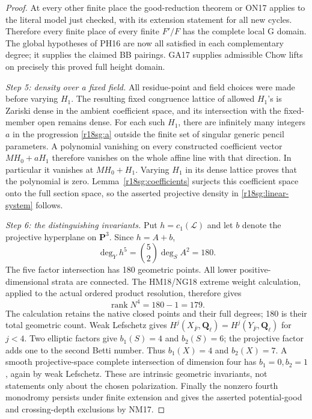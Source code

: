 \begin{proof}
At every other finite place the
good-reduction theorem or ON17
applies to the literal model just
checked, with its extension statement
for all new cycles.  Therefore every
finite place of every finite \(F'/F\)
has the complete local G domain.
The global hypotheses of PH16 are
now all satisfied in each complementary
degree; it supplies the claimed BB
pairings.  GA17 supplies admissible
Chow lifts on precisely this proved
full height domain.

\emph{Step 5: density over a fixed field.}
All residue-point and field choices
were made before varying \(H_1\).
The resulting fixed congruence lattice
of allowed \(H_1\)'s is Zariski dense
in the ambient coefficient space,
and its intersection with the
fixed-member open remains dense.
For each such \(H_1\), there are
infinitely many integers \(a\) in
the progression \eqref{r18sg:a}
outside the finite set of singular
generic pencil parameters.
A polynomial vanishing on every
constructed coefficient vector
\(MH_0+aH_1\) therefore vanishes
on the whole affine line with
that direction.  In particular
it vanishes at \(MH_0+H_1\).
Varying \(H_1\) in its dense
lattice proves that the polynomial
is zero.  Lemma~\ref{r18sg:coefficients}
surjects this coefficient space
onto the full section space,
so the asserted projective density
in \eqref{r18sg:linear-system}
follows.

\emph{Step 6: the distinguishing invariants.}
Put \(h=c_1(\mathcal L)\) and let
\(b\) denote the projective
hyperplane on \(\mathbf P^3\).
Since \(h=A+b\),
\[
             \deg_Y h^5=\binom52\deg_S A^2=180 .
 \tag{SG18.11}\label{r18sg:top-degree}
\]
The five factor intersection has
180 geometric points.  All lower
positive-dimensional strata are
connected.  The HM18/NG18 extreme
weight calculation, applied to the
actual ordered product resolution,
therefore gives
\[
                      \operatorname{rank}N^4=180-1=179 .
 \tag{SG18.12}\label{r18sg:monodromy}
\]
The calculation retains the native
closed points and their full degrees;
180 is their total geometric count.
Weak Lefschetz gives
\(H^j(X_{\bar F},\mathbf Q_\ell)
 =H^j(Y_{\bar F},\mathbf Q_\ell)\)
for \(j<4\).  Two elliptic factors
give \(b_1(S)=4\) and \(b_2(S)=6\);
the projective factor adds one to
the second Betti number.  Thus
\(b_1(X)=4\) and \(b_2(X)=7\).
A smooth projective-space complete
intersection of dimension four has
\(b_1=0,b_2=1\), again by weak
Lefschetz.  These are intrinsic
geometric invariants, not statements
only about the chosen polarization.
Finally the nonzero fourth monodromy
persists under finite extension and
gives the asserted potential-good
and crossing-depth exclusions by
NM17.
\end{proof}

